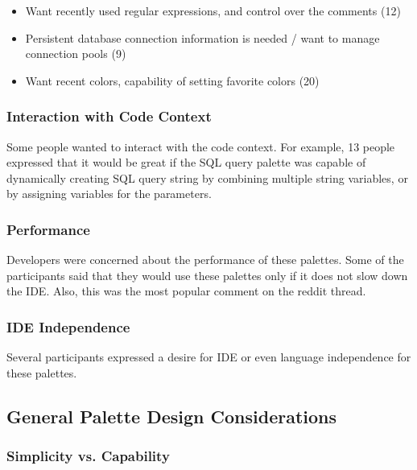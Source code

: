 \documentclass[conference]{IEEEtran}
\begin{document}
\begin{itemize}
	\item Want recently used regular expressions, and control over the comments (12)
	\item Persistent database connection information is needed / want to manage connection pools (9)
	\item Want recent colors, capability of setting favorite colors (20)
\end{itemize}

\subsubsection{Interaction with Code Context}

Some people wanted to interact with the code context. For example, 13 people expressed that it would be great if the SQL query palette was capable of dynamically creating SQL query string by combining multiple string variables, or by assigning variables for the parameters.

\subsubsection{Performance}

Developers were concerned about the performance of these palettes. Some of the participants said that they would use these palettes only if it does not slow down the IDE. Also, this was the most popular comment on the reddit thread.

\subsubsection{IDE Independence}

Several participants expressed a desire for IDE or even language independence for these palettes.


\subsection{General Palette Design Considerations}
\subsubsection{Simplicity vs. Capability}
\end{document}
